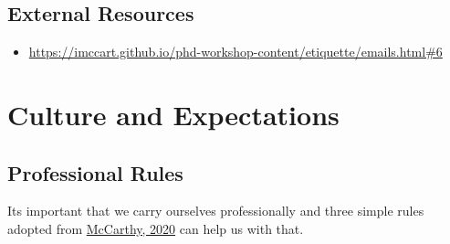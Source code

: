 \documentclass[
]{book}
\providecommand{\tightlist}{%
  \setlength{\itemsep}{0pt}\setlength{\parskip}{0pt}}
\begin{document}
\hypertarget{external-resources-1}{%
\section{External Resources}\label{external-resources-1}}

\begin{itemize}
\tightlist
\item
  \url{https://imccart.github.io/phd-workshop-content/etiquette/emails.html\#6}
\end{itemize}

\hypertarget{culture-and-expectations}{%
\chapter{\texorpdfstring{\textbf{Culture and Expectations}}{Culture and Expectations}}\label{culture-and-expectations}}

\hypertarget{professional-rules}{%
\section{Professional Rules}\label{professional-rules}}

Its important that we carry ourselves professionally and three simple rules adopted from \href{https://phdworkshop.classes.ianmccarthyecon.com/etiquette/}{McCarthy, 2020} can help us with that.
\end{document}
